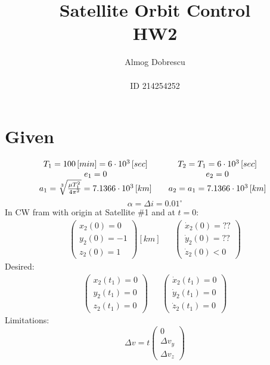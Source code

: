 \documentclass[11pt, a4paper]{article}
\title{Satellite Orbit Control \\ HW2}
\author{Almog Dobrescu\\\\ID 214254252}
\begin{document}
\maketitle

\thispagestyle{empty}
\newpage
\setcounter{page}{1}

\tableofcontents
\vfil
\listoffigures
\newpage

\section{Given}
\begin{equation*}
    \begin{matrix}
        T_1=100\left[min\right] = 6\cdot10^3\left[sec\right] && T_2 = T_1 = 6\cdot10^3\left[sec\right] \\
        e_1 = 0 && e_2 = 0 \\
        a_1 = \sqrt[3]{\frac{\mu T_1^2}{4\pi^2}} = 7.1366\cdot10^3\left[km\right] && a_2 = a_1 = 7.1366\cdot10^3\left[km\right]
    \end{matrix}\\
\end{equation*}
\begin{equation*}
    \alpha=\Delta i = 0.01^\circ
\end{equation*}
In CW fram with origin at Satellite \#1 and at $t=0$:
\begin{equation*}
    \begin{matrix}
    \begin{pmatrix}
        x_2(0)=0 \\ y_2(0)=-1 \\ z_2(0)=1
    \end{pmatrix}\left[km\right] &&
    \begin{pmatrix}
        \dot{x}_2(0)=?? \\ \dot{y}_2(0) = ?? \\ \dot{z}_2(0)<0
    \end{pmatrix}
    \end{matrix}
\end{equation*}
Desired:
\begin{equation*}
    \begin{matrix}
    \begin{pmatrix}
        x_2(t_1)=0 \\ y_2(t_1)=0 \\ z_2(t_1)=0
    \end{pmatrix} &&
    \begin{pmatrix}
        \dot{x}_2(t_1)=0 \\ \dot{y}_2(t_1)=0 \\ \dot{z}_2(t_1)=0
    \end{pmatrix}
    \end{matrix}
\end{equation*}
Limitations:
\begin{equation*}
    \Delta v = t \begin{pmatrix}
        0\\
        \Delta v_y\\
        \Delta v_z
    \end{pmatrix}
\end{equation*}
\end{document}
